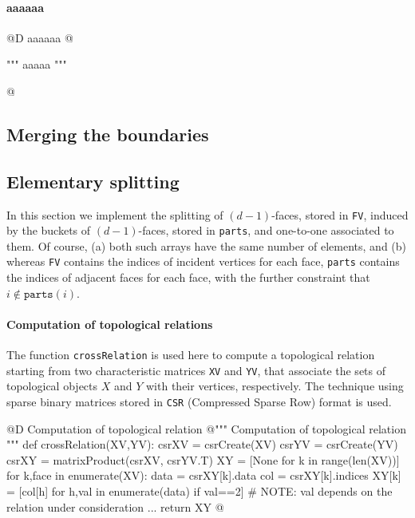 \documentclass[11pt,oneside]{article}    %
\begin{document}
\paragraph{aaaaaa}
@D aaaaaa
@{""" aaaaa """

@}


\subsection{Merging the boundaries}

\subsection{Elementary splitting}

In this section we implement the splitting of $(d-1)$-faces, stored in \texttt{FV}, induced by the buckets of $(d-1)$-faces, stored in \texttt{parts}, and one-to-one associated to them. Of course, (a) both such arrays have the same number of elements, and (b) whereas \texttt{FV} contains the indices of incident vertices for each face, \texttt{parts}  contains the indices of adjacent faces for each face, with the further constraint that $i \not\in \texttt{parts}(i)$.

\paragraph{Computation of topological relations} 
The function \texttt{crossRelation} is used here to compute a topological relation starting from two characteristic matrices \texttt{XV} and \texttt{YV}, that associate the sets of topological objects $X$ and $Y$ with their vertices, respectively.
The technique using sparse binary matrices stored in \texttt{CSR} (Compressed Sparse Row) format is used.

@D Computation of topological relation
@{""" Computation of topological relation """
def crossRelation(XV,YV):
    csrXV = csrCreate(XV)
    csrYV = csrCreate(YV)
    csrXY = matrixProduct(csrXV, csrYV.T)
    XY = [None for k in range(len(XV))]
    for k,face in enumerate(XV):
        data = csrXY[k].data
        col = csrXY[k].indices
        XY[k] = [col[h] for h,val in enumerate(data) if val==2] 
        # NOTE: val depends on the relation under consideration ...
    return XY
@}
    
\end{document}
